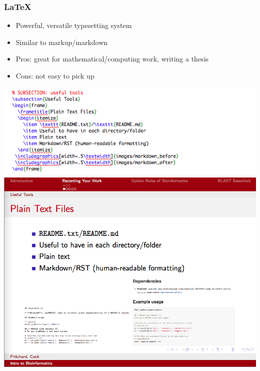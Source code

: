 \documentclass[table]{beamer}
\begin{document}
   \begin{frame}
     \frametitle{\LaTeX}
     \begin{itemize}
       \item Powerful, versatile typesetting system
       \item Similar to markup/markdown
       \item Pros: great for mathematical/computing work, writing a thesis
       \item Cons: not easy to pick up
     \end{itemize}
     \begin{center}
        \includegraphics[width=.35\textwidth]{images/latex_before}
        \includegraphics[width=.35\textwidth]{images/latex_after}     
     \end{center}
   \end{frame}

\end{document}

